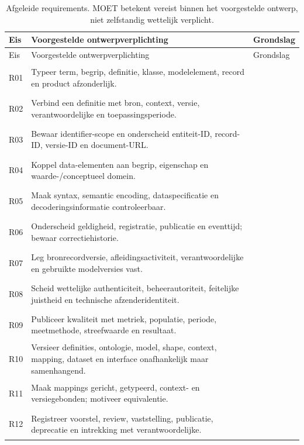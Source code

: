\begin{longtable}{@{}P{.07\linewidth}P{.64\linewidth}P{.22\linewidth}@{}}
\caption{Afgeleide requirements. MOET betekent vereist binnen het voorgestelde ontwerp, niet zelfstandig wettelijk verplicht.}\label{tab:req}\\
\toprule Eis & Voorgestelde ontwerpverplichting & Grondslag \\ \midrule\endfirsthead
\toprule Eis & Voorgestelde ontwerpverplichting & Grondslag \\ \midrule\endhead
\hypertarget{R01}{}R01 & Typeer term, begrip, definitie, klasse, modelelement, record en product afzonderlijk. & \citep{S11,S13,S31,S08} \\
\hypertarget{R02}{}R02 & Verbind een definitie met bron, context, versie, verantwoordelijke en toepassingsperiode. & \citep{S14,S25,S33} \\
\hypertarget{R03}{}R03 & Bewaar identifier-scope en onderscheid entiteit-ID, record-ID, versie-ID en document-URL. & \citep{S28,S38,S39,L08} \\
\hypertarget{R04}{}R04 & Koppel data-elementen aan begrip, eigenschap en waarde-/conceptueel domein. & \citep{S08,S13} \\
\hypertarget{R05}{}R05 & Maak syntax, semantic encoding, dataspecificatie en decoderingsinformatie controleerbaar. & \citep{S03} \\
\hypertarget{R06}{}R06 & Onderscheid geldigheid, registratie, publicatie en eventtijd; bewaar correctiehistorie. & \citep{L14,S37,S22} \\
\hypertarget{R07}{}R07 & Leg bronrecordversie, afleidingsactiviteit, verantwoordelijke en gebruikte modelversies vast. & \citep{S04,S33} \\
\hypertarget{R08}{}R08 & Scheid wettelijke authenticiteit, beheerautoriteit, feitelijke juistheid en technische afzenderidentiteit. & \citep{S25,S21,S33} \\
\hypertarget{R09}{}R09 & Publiceer kwaliteit met metriek, populatie, periode, meetmethode, streefwaarde en resultaat. & \citep{S05,S06,S12,S34,S48,L15} \\
\hypertarget{R10}{}R10 & Versieer definities, ontologie, model, shape, context, mapping, dataset en interface onafhankelijk maar samenhangend. & \citep{S14,S23,S47,S18} \\
\hypertarget{R11}{}R11 & Maak mappings gericht, getypeerd, context- en versiegebonden; motiveer equivalentie. & \citep{S31,S30,S13,S08} \\
\hypertarget{R12}{}R12 & Registreer voorstel, review, vaststelling, publicatie, deprecatie en intrekking met verantwoordelijke. & \citep{S10,S23,L07,L17} \\

\end{longtable}

